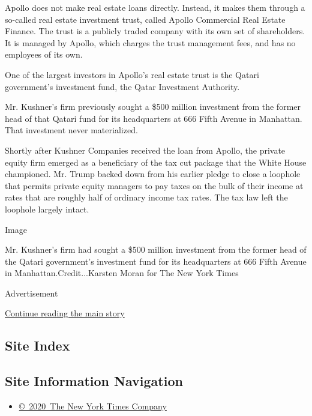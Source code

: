 Apollo does not make real estate loans directly. Instead, it makes them
through a so-called real estate investment trust, called Apollo
Commercial Real Estate Finance. The trust is a publicly traded company
with its own set of shareholders. It is managed by Apollo, which charges
the trust management fees, and has no employees of its own.

One of the largest investors in Apollo's real estate trust is the Qatari
government's investment fund, the Qatar Investment Authority.

Mr. Kushner's firm previously sought a \$500 million investment from the
former head of that Qatari fund for its headquarters at 666 Fifth Avenue
in Manhattan. That investment never materialized.

Shortly after Kushner Companies received the loan from Apollo, the
private equity firm emerged as a beneficiary of the tax cut package that
the White House championed. Mr. Trump backed down from his earlier
pledge to close a loophole that permits private equity managers to pay
taxes on the bulk of their income at rates that are roughly half of
ordinary income tax rates. The tax law left the loophole largely intact.

Image

Mr. Kushner's firm had sought a \$500 million investment from the former
head of the Qatari government's investment fund for its headquarters at
666 Fifth Avenue in Manhattan.Credit...Karsten Moran for The New York
Times

Advertisement

\protect\hyperlink{after-bottom}{Continue reading the main story}

\hypertarget{site-index}{%
\subsection{Site Index}\label{site-index}}

\hypertarget{site-information-navigation}{%
\subsection{Site Information
Navigation}\label{site-information-navigation}}

\begin{itemize}
\tightlist
\item
  \href{https://help.nytimes.com/hc/en-us/articles/115014792127-Copyright-notice}{©~2020~The
  New York Times Company}
\end{itemize}

